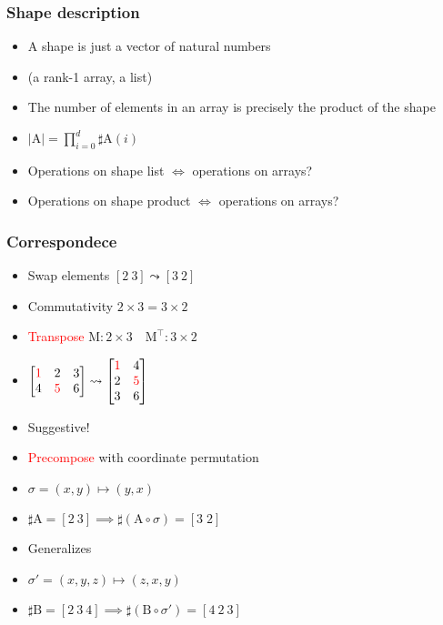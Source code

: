 \documentclass[xetex,mathserif,serif]{beamer}
\newcommand\mrm[1]{\mathrm{#1}}
\newcommand\brm[1]{\bm{\mrm{#1}}}
\newcommand\NB[1]{\textcolor{red}{#1}}
\begin{document}
\begin{frame}
  \frametitle{Shape description}
  \begin{itemize}[<+->]
    \item A shape is just a vector of natural numbers
    \item (a rank-1 array, a list)
    \item The number of elements in an array is precisely the
      product of the shape
    \item $|\brm A| = \prod_{i=0}^d \sharp \brm A (i)$
    \item Operations on shape list $\iff$ operations on arrays?
    \item Operations on shape product $\iff$ operations on arrays?
  \end{itemize}
\end{frame}

\begin{frame}
  \frametitle{Correspondece}
  \begin{itemize}[<+->]
    \item Swap elements $[2\ 3] \leadsto [3\ 2]$
    \item Commutativity $2\times3 = 3\times2$
    \item \NB{Transpose} $\brm M : 2\times3\quad \brm M^\intercal : 3\times2$
    \item $
      \begin{bmatrix}
        \NB 1 & 2 & 3 \\
        4 & \NB 5 & 6
      \end{bmatrix} \leadsto
      \begin{bmatrix}
        \NB 1 & 4 \\
        2 & \NB 5 \\
        3 & 6
      \end{bmatrix}
    $
    \item Suggestive!
    \item \NB{Precompose} with coordinate permutation
    \item $\sigma = (x, y) \mapsto (y, x)$
    \item $\sharp \brm A = [2\ 3] \implies \sharp(\brm A \circ \sigma) = [3\;2]$ 
    \item Generalizes
    \item $\sigma' = (x, y, z) \mapsto (z, x, y)$
    \item $\sharp \brm B = [2\ 3\ 4] \implies \sharp(\brm B \circ \sigma') = [4\ 2\ 3]$ 
  \end{itemize}
\end{frame}
\end{document}
